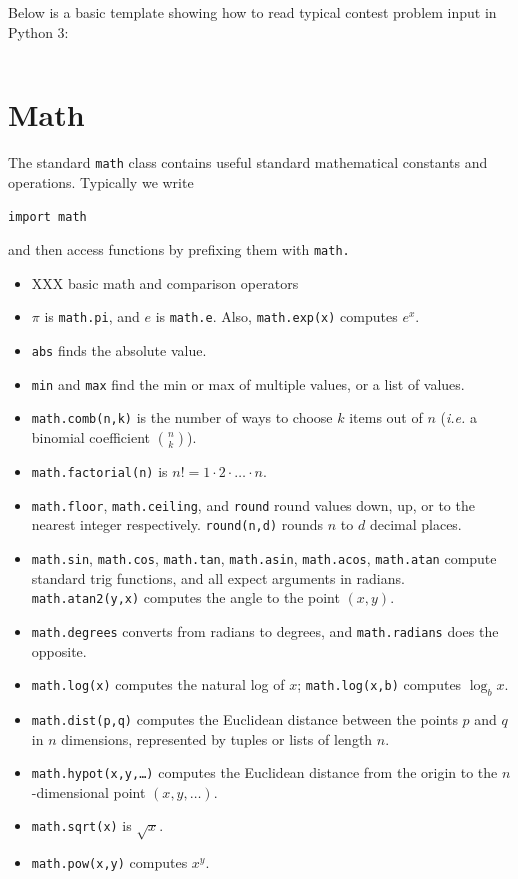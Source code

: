 \documentclass[10pt]{book}
\newcommand{\pycode}[1]{\inputminted[linenos=true,mathescape]{python}{code/#1}}
\newcommand{\py}[1]{\texttt{#1}}
\begin{document}
Below is a basic template showing how to read typical contest problem
input in Python 3:

\pycode{python/template.py}

\section{Math}

The standard \py{math} class contains useful standard mathematical
constants and operations.  Typically we write
\begin{verbatim}
import math
\end{verbatim}
and then access functions by prefixing them with \py{math.}
\begin{itemize}
\item XXX basic math and comparison operators
\item $\pi$ is \py{math.pi}, and $e$ is \py{math.e}.  Also,
  \py{math.exp(x)} computes $e^x$.
\item \py{abs} finds the absolute value.
\item \py{min} and \py{max} find the min or max of multiple
  values, or a list of values.
\item \py{math.comb(n,k)} is the number of ways to choose $k$
  items out of $n$ (\emph{i.e.} a binomial coefficient $\binom n k$).
\item \py{math.factorial(n)} is $n! = 1 \cdot 2 \cdot \dots \cdot
  n$.
\item \py{math.floor}, \py{math.ceiling}, and
  \py{round} round values down, up, or to the nearest integer
  respectively.  \py{round(n,d)} rounds $n$ to $d$ decimal places.
\item \py{math.sin}, \py{math.cos}, \py{math.tan},
  \py{math.asin}, \py{math.acos}, \py{math.atan} compute
  standard trig functions, and all expect arguments in
  radians. \py{math.atan2(y,x)} computes the angle to the point
  $(x,y)$.
\item \py{math.degrees} converts from radians to degrees, and
  \py{math.radians} does the opposite.
\item \py{math.log(x)} computes the natural log of $x$;
  \py{math.log(x,b)} computes $\log_b x$.
\item \py{math.dist(p,q)} computes the Euclidean distance between
  the points $p$ and $q$ in $n$ dimensions, represented by tuples or
  lists of length $n$.
\item \py{math.hypot(x,y,\dots)} computes the Euclidean distance from
  the origin to the $n$-dimensional point $(x,y,\dots)$.
\item \py{math.sqrt(x)} is $\sqrt{x}$.
\item \py{math.pow(x,y)} computes $x^y$.
\end{itemize}
\end{document}
